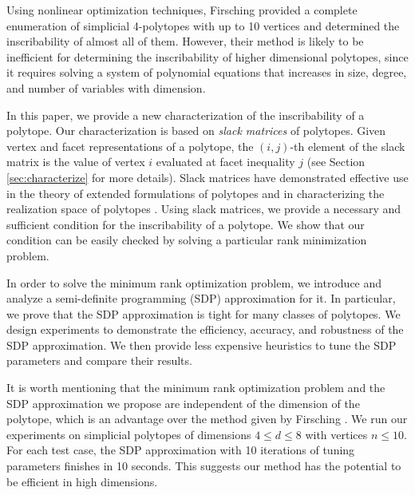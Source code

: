 \documentclass[smallextended, envcountsame]{svjour3}
\begin{document}
    Using nonlinear optimization techniques, Firsching \cite{firsching2017realizability} provided a complete enumeration of simplicial 4-polytopes with up to 10 vertices and determined the inscribability of almost all of them.  However, their method is likely to be inefficient for determining the inscribability of higher dimensional polytopes, since it requires solving a system of polynomial equations that increases in size, degree, and number of variables with dimension.
    
    In this paper, we provide a new characterization of the inscribability of a polytope.  Our characterization is based on {\em slack matrices} of polytopes.  Given vertex and facet representations of a polytope, the $(i,j)$-th element of the slack matrix is the value of vertex $i$ evaluated at facet inequality $j$ (see Section \ref{sec:characterize} for more details).  Slack matrices have demonstrated effective use in the theory of extended formulations of polytopes \cite{braun2015approximation,fiorini2012linear,rothvoss2017matching,yannakakis1988expressing} and in characterizing the realization space of polytopes \cite{gouveia2019slack,gouveia2023combining}.  Using slack matrices, we provide a necessary and sufficient condition for the inscribability of a polytope.  We show that our condition can be easily checked by solving a particular rank minimization problem.
    
    In order to solve the minimum rank optimization problem, we introduce and analyze a semi-definite programming (SDP) approximation for it.  In particular, we prove that the SDP approximation is tight for many classes of polytopes.  We design experiments to demonstrate the efficiency, accuracy, and robustness of the SDP approximation.  We then provide less expensive heuristics to tune the SDP parameters and compare their results.
    
    It is worth mentioning that the minimum rank optimization problem and the SDP approximation we propose are independent of the dimension of the polytope, which is an advantage over the method given by Firsching \cite{firsching2017realizability}.  We run our experiments on simplicial polytopes of dimensions $4\le d\le 8$ with vertices $n\le 10$.  For each test case, the SDP approximation with 10 iterations of tuning parameters finishes in 10 seconds.  This suggests our method has the potential to be efficient in high dimensions.
    
\end{document}
